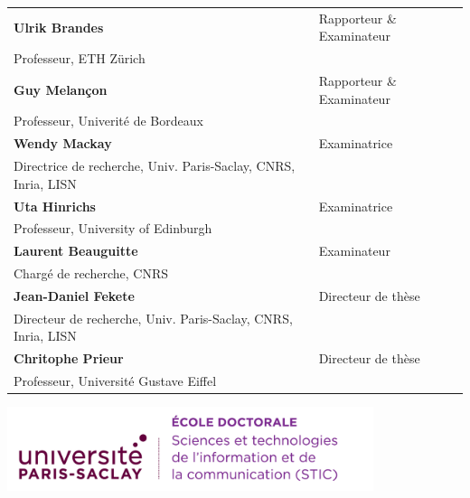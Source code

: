 \documentclass[12pt,a4paper, twoside]{book}
\begin{document}
\begin{titlepage}
        \begin{tabular}{|p{9cm}l}
            \arrayrulecolor{Prune}
            \textbf{Ulrik Brandes} & Rapporteur \& Examinateur \\
            Professeur, ETH Zürich  &                                   \\
            \textbf{Guy Melançon} & Rapporteur \& Examinateur \\
            Professeur, Univerité de Bordeaux  &                                   \\
            \textbf{Wendy Mackay} & Examinatrice       \\
            Directrice de recherche, Univ. Paris-Saclay, CNRS, Inria, LISN  &   \\
            \textbf{Uta Hinrichs} & Examinatrice       \\
            Professeur, University of Edinburgh  &                                   \\
            \textbf{Laurent Beauguitte} & Examinateur       \\
            Chargé de recherche, CNRS  &                                   \\
            \textbf{Jean-Daniel Fekete} & Directeur de thèse  \\
            Directeur de recherche, Univ. Paris-Saclay, CNRS, Inria, LISN  &                                   \\
            \textbf{Chritophe Prieur} & Directeur de thèse  \\
            Professeur, Université Gustave Eiffel  &           
        \end{tabular}

    \end{titlepage}

    \Ifthispageodd{\newpage\thispagestyle{empty}\null\newpage}{}
    \thispagestyle{empty}
    \selectfont

    \lhead{}
    \rhead{}
    \rfoot{}
    \cfoot{}
    \lfoot{}

    \noindent
    \includegraphics[height=2.45cm]{static/logos/logo_usp_STIC}
    \vspace{1cm}
    \selectfont
\end{document}
